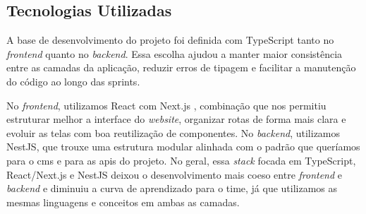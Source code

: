 \subsection{Tecnologias Utilizadas}
  A base de desenvolvimento do projeto foi definida com TypeScript \cite{typescript} tanto no \textit{frontend} quanto no \textit{backend}. Essa escolha ajudou a manter maior consistência entre as camadas da aplicação, reduzir erros de tipagem e facilitar a manutenção do código ao longo das sprints.

  No \textit{frontend}, utilizamos React \cite{react} com Next.js \cite{nextjs}, combinação que nos permitiu estruturar melhor a interface do \textit{website}, organizar rotas de forma mais clara e evoluir as telas com boa reutilização de componentes. No \textit{backend}, utilizamos NestJS, que trouxe uma estrutura modular alinhada com o padrão que queríamos para o \ac{cms} e para as \ac{api}s do projeto. No geral, essa \textit{stack} focada em TypeScript, React/Next.js e NestJS deixou o desenvolvimento mais coeso entre \textit{frontend} e \textit{backend} e diminuiu a curva de aprendizado para o time, já que utilizamos as mesmas linguagens e conceitos em ambas as camadas.
  
